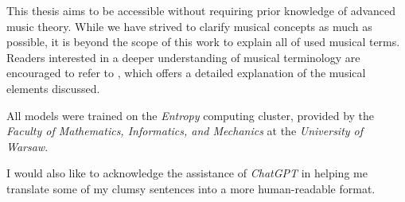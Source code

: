 This thesis aims to be accessible without requiring prior knowledge of advanced music theory. While we have strived to clarify musical concepts as much as possible, it is beyond the scope of this work to explain all of used musical terms. Readers interested in a deeper understanding of musical terminology are encouraged to refer to \cite{Read1969}, which offers a detailed explanation of the musical elements discussed.

All models were trained on the \emph{Entropy} computing cluster, provided by the \emph{Faculty of Mathematics, Informatics, and Mechanics} at the \emph{University of Warsaw}.

I would also like to acknowledge the assistance of \emph{ChatGPT} in helping me translate some of my clumsy sentences into a more human-readable format.